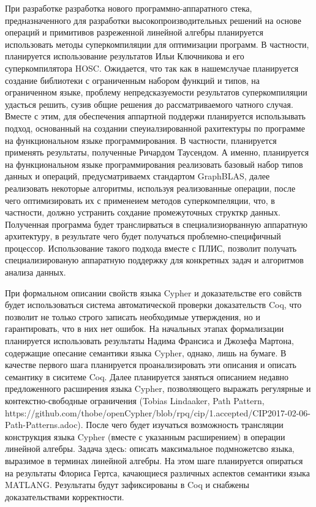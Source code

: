 \documentclass[12pt]{article}  %
\theoremstyle{remark}
\begin{document}
При разработке разработка нового программно-аппаратного стека, предназначенного для разработки высокопроизводительных решений на основе операций и примитивов разреженной линейной алгебры планируется использовать методы суперкомпиляции для оптимизации программ. В частности, планируется использование результатов Ильи Ключникова и его суперкомпилятора HOSC. Ожидается, что так как в нашемслучае планируется создание библиотеки с ограниченным набором функций и типов, на ограниченном языке, проблему непредсказуемости результатов суперкомпиляции удасться решить, сузив общие решения до рассматриваемого чатного случая. Вместе с этим, для обеспечения аппартной поддержи планируется использывать подход, основанный на создании спеуиалзированной рахитектуры по программе на функциональном языке программирования. В частности, планируется применять результаты, полученные Ричардом Таусендом. А именно, планируется на функциональном языке программирования реализовать базовый набор типов данных и операций, предусматриваемх стандартом GraphBLAS, далее реализовать некоторые алгоритмы, используя реализованные операции, после чего оптимизировать их с применеием методов суперкомпеляции, что, в частности, должно устранить сохдание промежуточных структкр данных. Полученная программа будет транслирваться в специализиорванную аппаратную архитектуру, в результате чего будет получаться проблемно-специфичный процессор. Использование такого подхода вместе с ПЛИС, позволит получать специализированую аппаратную поддержку для конкретных задач и алгоритмов анализа данных.

При формальном описании свойств языка Cypher и доказательстве его совйств будет использоваться система автоматической проверки доказательств Coq, что позволит не только строго записать необходимые утверждения, но и гарантировать, что в них нет ошибок. На начальных этапах формализации планируется использовать результаты Надима Франсиса и Джозефа Мартона, содержащие опесание семантики языка Cypher, однако, лишь на бумаге. В качестве первого шага планируется проанализировать эти описания и описать семантику в сиситеме Coq. Далее планируется заняться описанием недавно предложенного расширения языка Cypher, позволяющего выражать регулярные и контекстно-свободные ограничения (Tobias Lindaaker, Path Pattern, https://github.com/thobe/openCypher/blob/rpq/cip/1.accepted/CIP2017-02-06-Path-Patterns.adoc). После чего будет изучаться возможность трансляции конструкция языка Cypher (вместе с указанным расширением) в операции линейной алгебры. Задача здесь: описать максимальное подмножетсво языка, выразимое в терминах линейной алгебры. На этом шаге планируется опираться на результаты Флориса Гертса, качающиеся различных аспектов семантики языка MATLANG. Результаты будут зафиксированы в Coq и снабжены доказательствами корректности. 
\end{document}
